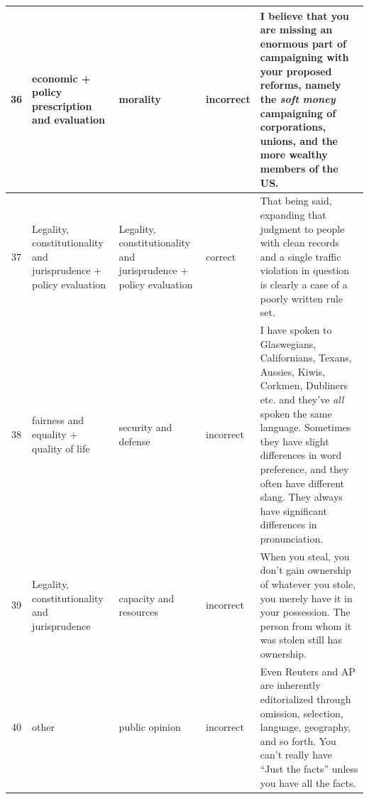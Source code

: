 \documentclass[
10pt, %
a4paper, %
oneside, %
headinclude,footinclude, %
] {book}%
\begin{document}
\begin{longtable}{|c|p{2.5cm}|p{2.5cm}|p{2.5cm}|p{4.0cm}|}
36 & economic + policy prescription and evaluation & morality & incorrect & I believe that you are missing an enormous part of campaigning with your proposed reforms, namely the \textit{soft money} campaigning of corporations, unions, and the more wealthy members of the US. \\ \hline

37 & Legality, constitutionality and jurisprudence + policy evaluation & Legality, constitutionality and jurisprudence + policy evaluation & correct & That being said, expanding that judgment to people with clean records and a single traffic violation in question is clearly a case of a poorly written rule set. \\ \hline

38 & fairness and equality + quality of life & security and defense & incorrect & I have spoken to Glaswegians, Californians, Texans, Aussies, Kiwis, Corkmen, Dubliners etc. and they've \textit{all} spoken the same language. Sometimes they have slight differences in word preference, and they often have different slang. They always have significant differences in pronunciation. \\ \hline

39 & Legality, constitutionality and jurisprudence & capacity and resources & incorrect & When you steal, you don't gain ownership of whatever you stole, you merely have it in your possession. The person from whom it was stolen still has ownership. \\ \hline

40 & other & public opinion & incorrect & Even Reuters and AP are inherently editorialized through omission, selection, language, geography, and so forth. You can't really have ``Just the facts'' unless you have all the facts. \\ \hline

\end{longtable}

\newpage
\end{document}
